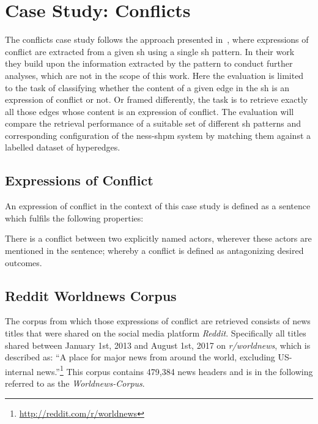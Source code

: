 \documentclass[11pt]{scrreprt}
\let\citef\cite  %
\let\cite\parencite  %
\begin{document}
{\section{Case Study: Conflicts}
The conflicts case study follows the approach presented in \citef{menezesSemanticHypergraphs2021}, where expressions of conflict are extracted from a given \gls{sh} using a single \gls{sh} pattern. In their work they build upon the information extracted by the pattern to conduct further analyses, which are not in the scope of this work. Here the evaluation is limited to the task of classifying whether the content of a given edge in the \gls{sh} is an expression of conflict or not. Or framed differently, the task is to retrieve exactly all those edges whose content is an expression of conflict. The evaluation will compare the retrieval performance of a suitable set of different \gls{sh} patterns and corresponding configuration of the \gls{ness-shpm} system by matching them against a labelled dataset of hyperedges.


\subsection{Expressions of Conflict}
\label{sec:conflict-definition}
An expression of conflict in the context of this case study is defined as a sentence which fulfils the following properties:

\begin{displayquote}
There is a conflict between two explicitly named actors, wherever these actors are mentioned in the sentence; whereby a conflict is defined as antagonizing desired outcomes.
\end{displayquote}

\subsection{Reddit Worldnews Corpus}
The corpus from which those expressions of conflict are retrieved consists of news titles that were shared on the social media platform \textit{Reddit}. Specifically all titles shared between January 1st, 2013 and August 1st, 2017 on \textit{r/worldnews}, which is described as: “A place for major news from around the world, excluding US-internal news.”\footnote{\url{http://reddit.com/r/worldnews}} This corpus contains 479,384 news headers and is in the following referred to as the \textit{Worldnews-Corpus}.

}
\end{document}
